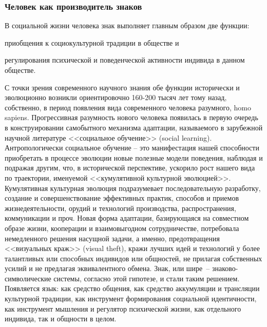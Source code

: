 \subsubsection{Человек как производитель знаков}
\label{2.1}
В социальной жизни человека знак выполняет главным образом две
функции:
\begin{enumerate*}[label=\asbuk*)]
    \item приобщения к социокультурной традиции в обществе и
    \item регулирования психической и поведенческой активности индивида в
данном обществе.
\end{enumerate*}
С точки зрения современного научного знания обе
функции исторически и эволюционно возникли ориентировочно 160-200
тысяч лет тому назад, собственно, в период появления вида современного
человека разумного, homo sapiens\autocite{pagel2012wired}. Прогрессивная
разумность нового человека появилась в первую очередь в
конструировании самобытного механизма адаптации, называемого в
зарубежной научной литературе <<социальное обучение>>
(social learning)\autocites{ormrod1999human}{miller2010theories}{online:sociallearning}.
Антропологически социальное обучение -- это манифестация
нашей способности приобретать в процессе эволюции новые полезные
модели поведения, наблюдая и подражая другим, что, в исторической
перспективе, ускорило рост нашего вида по траектории, именуемой
<<кумулятивной культурной эволюцией>>. Кумулятивная культурная
эволюция подразумевает последовательную разработку, создание и
совершенствование эффективных практик, способов и приемов
жизнедеятельности, орудий и технологий производства, распространения,
коммуникации и проч. Новая форма адаптации, базирующаяся на
совместном образе жизни, кооперации и взаимовыгодном сотрудничестве,
потребовала немедленного решения насущной задачи, а именно,
предотвращения <<визуальных краж>> (visual theft), кражи лучших идей и
технологий у более талантливых или способных индивидов или общностей,
не прилагая собственных усилий и не предлагая эквивалентного обмена\autocite{pagel2012wired}.
Знак, или шире~-- знаково-символические системы, согласно этой
гипотезе, и стали таким решением. Появляется язык: как средство общения,
как средство аккумуляции и трансляции культурной традиции, как
инструмент формирования социальной идентичности, как инструмент
мышления и регулятор психической жизни, как отдельного индивида, так и
общности в целом.


